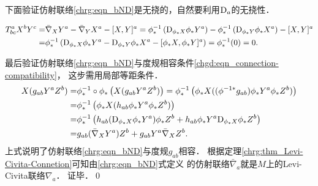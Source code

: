 下面验证仿射联络\eqref{chrg:eqn_bND}是无挠的，自然要利用${\rm D}_a$的无挠性．
\begin{small}
\begin{align*}
	T^a_{bc} X^b Y^c = & \bar{\nabla}_X Y^a - \bar{\nabla}_Y X^a -[X,Y]^a 
	=  \phi^{-1}_* \left( {\rm D}_{\phi_* X} \phi_*Y^a \right) 
	-\phi^{-1}_* \left( {\rm D}_{\phi_* Y} \phi_*X^a \right) -[X,Y]^a \\
	=&\phi^{-1}_* \left( {\rm D}_{\phi_* X} \phi_*Y^a 
	-  {\rm D}_{\phi_* Y} \phi_*X^a -[\phi_*X,\phi_*Y]^a \right) 
	=\phi^{-1}_*(0) = 0.
\end{align*} %
\end{small}
最后验证仿射联络\eqref{chrg:eqn_bND}与度规相容条件\eqref{chgd:eqn_connection-compatibility}，
这步需用局部等距条件．
\begin{align*}
	X(g_{ab} Y^a Z^b) = & \phi^{-1}_*\circ \phi_* \left(X(g_{ab} Y^a Z^b) \right)
	=\phi^{-1}_*  \left(\phi_* X( (\phi^{-1*}g_{ab}) \phi_*Y^a \phi_*Z^b) \right) \\
	=& \phi^{-1}_*  \left(\phi_* X(h_{ab} \phi_*Y^a \phi_*Z^b) \right)\\
	=& \phi^{-1}_*  \left(h_{ab} ({\rm D}_{\phi_* X} \phi_*Y^a) \phi_*Z^b
	 + h_{ab} \phi_*Y^a {\rm D}_{\phi_* X}\phi_*Z^b\right) \\
	=&g_{ab} (\bar{\nabla}_{X} Y^a) Z^b + g_{ab} Y^a \bar{\nabla}_{X} Z^b .
\end{align*}
上式说明了仿射联络\eqref{chrg:eqn_bND}与度规$g_{ab}$相容．
根据定理\ref{chrg:thm_Levi-Civita-Connetion}可知由\eqref{chrg:eqn_bND}式定义
的仿射联络$\bar{\nabla}_a$就是$M$上的Levi-Civita联络${\nabla}_a$．
证毕．\qed


